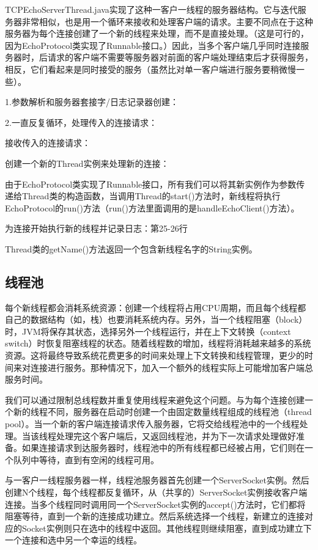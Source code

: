 		TCPEchoServerThread.java实现了这种一客户一线程的服务器结构。它与迭代服务器非常相似，也是用一个循环来接收和处理客户端的请求。主要不同点在于这种服务器为每个连接创建了一个新的线程来处理，而不是直接处理。（这是可行的，因为EchoProtocol类实现了Runnable接口。）因此，当多个客户端几乎同时连接服务器时，后请求的客户端不需要等服务器对前面的客户端处理结束后才获得服务，相反，它们看起来是同时接受的服务（虽然比对单一客户端进行服务要稍微慢一些）。 

		

		1.参数解析和服务器套接字/日志记录器创建：

		2.一直反复循环，处理传入的连接请求：

		接收传入的连接请求：

		创建一个新的Thread实例来处理新的连接：

		由于EchoProtocol类实现了Runnable接口，所有我们可以将其新实例作为参数传递给Thread类的构造函数，当调用Thread的start()方法时，新线程将执行EchoProtocol的run()方法（run()方法里面调用的是handleEchoClient()方法）。 

		为连接开始执行新的线程并记录日志：第25-26行 

		Thread类的getName()方法返回一个包含新线程名字的String实例。 

	\subsection{线程池} 

		每个新线程都会消耗系统资源：创建一个线程将占用CPU周期，而且每个线程都自己的数据结构（如，栈）也要消耗系统内存。另外，当一个线程阻塞（block）时，JVM将保存其状态，选择另外一个线程运行，并在上下文转换（context switch）时恢复阻塞线程的状态。随着线程数的增加，线程将消耗越来越多的系统资源。这将最终导致系统花费更多的时间来处理上下文转换和线程管理，更少的时间来对连接进行服务。那种情况下，加入一个额外的线程实际上可能增加客户端总服务时间。 

		我们可以通过限制总线程数并重复使用线程来避免这个问题。与为每个连接创建一个新的线程不同，服务器在启动时创建一个由固定数量线程组成的线程池（thread pool）。当一个新的客户端连接请求传入服务器，它将交给线程池中的一个线程处理。当该线程处理完这个客户端后，又返回线程池，并为下一次请求处理做好准备。如果连接请求到达服务器时，线程池中的所有线程都已经被占用，它们则在一个队列中等待，直到有空闲的线程可用。 

		与一客户一线程服务器一样，线程池服务器首先创建一个ServerSocket实例。然后创建N个线程，每个线程都反复循环，从（共享的）ServerSocket实例接收客户端连接。当多个线程同时调用同一个ServerSocket实例的accept()方法时，它们都将阻塞等待，直到一个新的连接成功建立。然后系统选择一个线程，新建立的连接对应的Socket实例则只在选中的线程中返回。其他线程则继续阻塞，直到成功建立下一个连接和选中另一个幸运的线程。 

